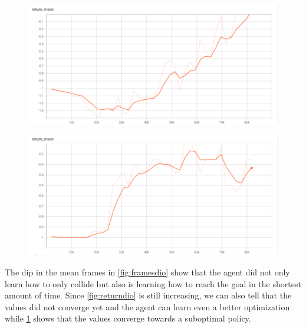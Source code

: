 \begin{figure}[H]
      \begin{minipage}{.5\textwidth}
        \centering
        \includegraphics[width=1\linewidth]{figures/dioreturn.png}
        \label{fig:returndio}
      \end{minipage}%
      \begin{minipage}{.5\textwidth}
        \centering
        \includegraphics[width=1\linewidth]{figures/rlreturn.png}
        \label{fig:returnrl}
      \end{minipage}
    \end{figure}

    The dip in the mean frames in \ref{fig:framesdio} show that the agent did not only learn 
    how to only collide but also is learning how to reach the goal in the shortest amount of time. 
    Since \ref{fig:returndio} is still increasing, we can also tell that the values did not converge yet and 
    the agent can learn even a better optimization while \ref{fig:returnrl} shows that the values converge towards
    a suboptimal policy.


